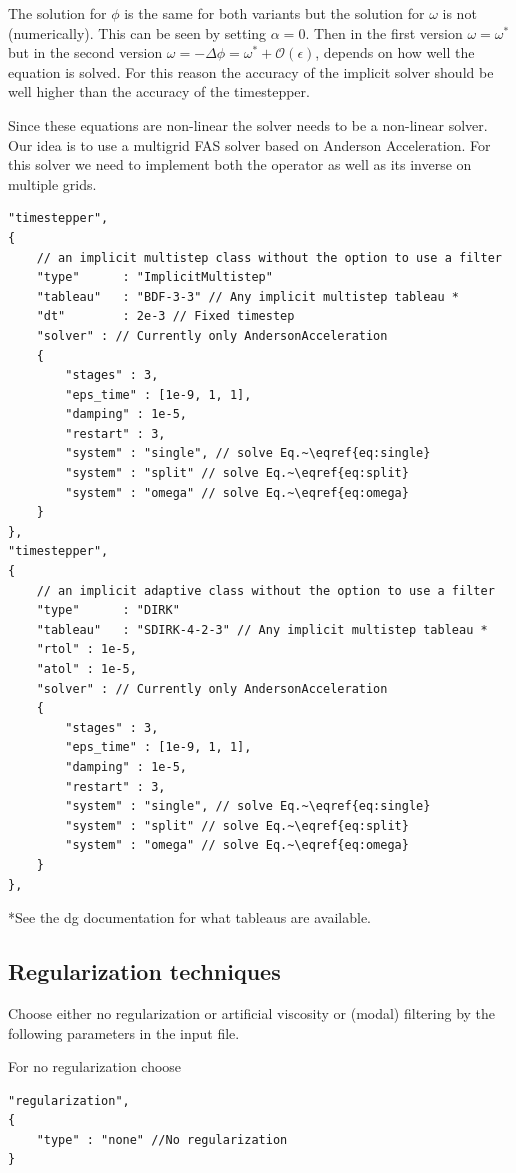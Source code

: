 The solution for $\phi$ is the same for both variants but the solution for
$\omega$ is not (numerically). This can be seen by setting $\alpha=0$. Then in
the first version $\omega=\omega^*$ but in the second version
$\omega=-\Delta\phi = \omega^* + \mathcal O(\epsilon)$, depends on how well the
equation is solved. For this reason the accuracy of the implicit solver should
be well higher than the accuracy of the timestepper.

Since these equations are non-linear the solver needs to be a non-linear solver. Our idea is to use a multigrid FAS solver based on Anderson Acceleration. For this solver we need to implement both the operator as well as its inverse on multiple grids.
\begin{verbatim}
"timestepper",
{
    // an implicit multistep class without the option to use a filter
    "type"      : "ImplicitMultistep"
    "tableau"   : "BDF-3-3" // Any implicit multistep tableau *
    "dt"        : 2e-3 // Fixed timestep
    "solver" : // Currently only AndersonAcceleration
    {
        "stages" : 3,
        "eps_time" : [1e-9, 1, 1],
        "damping" : 1e-5,
        "restart" : 3,
        "system" : "single", // solve Eq.~\eqref{eq:single}
        "system" : "split" // solve Eq.~\eqref{eq:split}
        "system" : "omega" // solve Eq.~\eqref{eq:omega}
    }
},
"timestepper",
{
    // an implicit adaptive class without the option to use a filter
    "type"      : "DIRK"
    "tableau"   : "SDIRK-4-2-3" // Any implicit multistep tableau *
    "rtol" : 1e-5,
    "atol" : 1e-5,
    "solver" : // Currently only AndersonAcceleration
    {
        "stages" : 3,
        "eps_time" : [1e-9, 1, 1],
        "damping" : 1e-5,
        "restart" : 3,
        "system" : "single", // solve Eq.~\eqref{eq:single}
        "system" : "split" // solve Eq.~\eqref{eq:split}
        "system" : "omega" // solve Eq.~\eqref{eq:omega}
    }
},
\end{verbatim}
*See the dg documentation for what tableaus are available.
\subsection{Regularization techniques}
Choose either no regularization or artificial viscosity or (modal) filtering by the following
parameters in the input file.

For no regularization choose
\begin{verbatim}
"regularization",
{
    "type" : "none" //No regularization
}
\end{verbatim}


